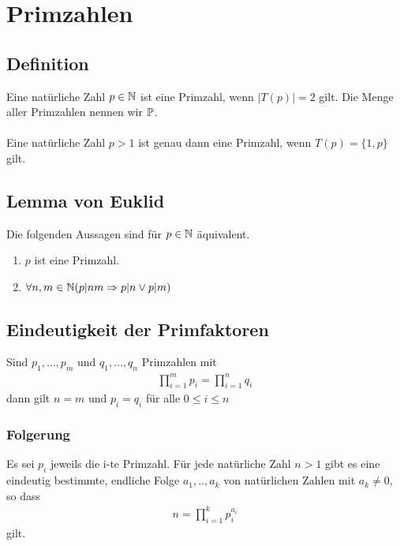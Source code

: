 \section{Primzahlen}
\subsection{Definition}
Eine natürliche Zahl $p \in \mathbb{N}$ ist eine Primzahl, wenn $|T(p)| = 2$ gilt. Die Menge aller Primzahlen
nennen wir $\mathbb{P}$.\\\\
Eine natürliche Zahl $p > 1$ ist genau dann eine Primzahl, wenn
$T(p) = \{1, p\}$ gilt.
\subsection{Lemma von Euklid}
Die folgenden Aussagen sind für $p \in \mathbb{N} $ äquivalent.
\begin{enumerate}
    \item $p$ ist eine Primzahl.
    \item $\forall{n,m} \in \mathbb{N} (p|nm \Rightarrow p|n \vee p|m)$
\end{enumerate}
\subsection{Eindeutigkeit der Primfaktoren}
Sind $p_1, \ldots, p_m$ und $q_1, \ldots, q_n$ Primzahlen mit
\begin{align*}
    \prod_{i=1}^{m} p_i = \prod_{i=1}^{n} q_i
\end{align*}
dann gilt $n=m$ und $p_i = q_i$ für alle $0 \leq i \leq n$
\subsubsection{Folgerung}
Es sei $p_i$ jeweils die i-te Primzahl. Für jede natürliche Zahl $n > 1$
gibt es eine eindeutig bestimmte, endliche Folge $a_1, .., a_k$ von
natürlichen Zahlen mit $a_k \neq 0$, so dass
\begin{align*}
    n = \prod_{i=1}^{k} p_i^{a_i}
\end{align*}
gilt.